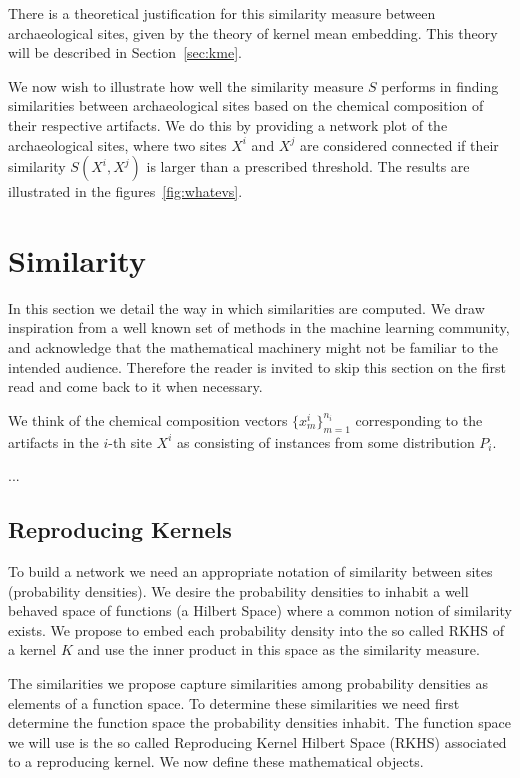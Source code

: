 There is a theoretical justification for this similarity measure between archaeological sites, given by the theory of kernel mean embedding. This theory will be described in Section~\ref{sec:kme}.

We now wish to illustrate how well the similarity measure $S$ performs in finding similarities between archaeological sites based on the chemical composition of their respective artifacts. We do this by providing a network plot of the archaeological sites, where two sites $X^i$ and $X^j$ are considered connected if their similarity $S(X^i,X^j)$ is larger than a prescribed threshold. The results are illustrated in the figures~\ref{fig:whatevs}.

\section{Similarity}

\label{sec:similarity}

In this section we detail the way in which similarities are computed. We draw inspiration from a well known set of methods in the machine learning community, and acknowledge that the mathematical machinery might not be familiar to the intended audience. Therefore the reader is invited to skip this section on the first read and come back to it when necessary.

We think of the chemical composition vectors $\{x^i_m\}_{m=1}^{n_i}$ corresponding to the artifacts in the $i$-th site $X^i$ as consisting of instances from some distribution $P_i$.

...

\subsection{Reproducing Kernels}

\label{kernels}

To build a network we need an appropriate notation of similarity between sites (probability densities). We desire the probability densities to inhabit a well behaved space of functions (a Hilbert Space) where a common notion of similarity exists. We propose to embed each probability density into the so called RKHS of a kernel $K$ and use the inner product in this space as the similarity measure.

The similarities we propose capture similarities among probability densities as elements of a function space. To determine these similarities we need first determine the function space the probability densities inhabit. The function space we will use is the so called Reproducing Kernel Hilbert Space (RKHS) associated to a reproducing kernel. We now define these mathematical objects.

